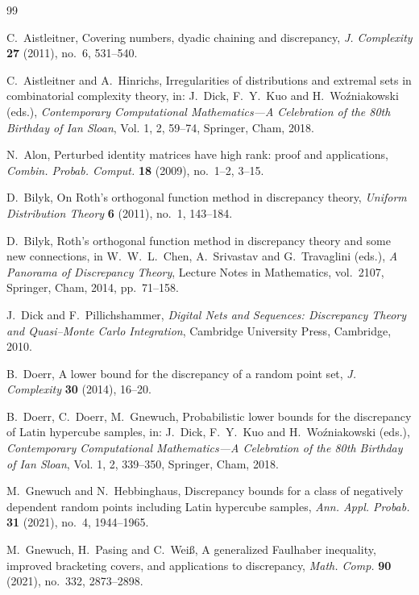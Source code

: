 \documentclass[11pt]{article}
\theoremstyle{plain}
\theoremstyle{remark}
\theoremstyle{definition}
\newcommand{\1}{\mathbf{1}}
\begin{document}
\begin{thebibliography}{99}

C.~Aistleitner,
\newblock Covering numbers, dyadic chaining and discrepancy,
\newblock \emph{J. Complexity} \textbf{27} (2011), no.~6, 531--540.

C.~Aistleitner and A.~Hinrichs,
\newblock Irregularities of distributions and extremal sets in combinatorial complexity theory,
\newblock in: J.~Dick, F.~Y.~Kuo and H.~Wo\'{z}niakowski (eds.),
\emph{Contemporary Computational Mathematics---A Celebration of the 80th Birthday of Ian Sloan}, Vol. 1, 2, 59--74, Springer, Cham, 2018.


N.~Alon,
\newblock Perturbed identity matrices have high rank:
proof and applications,
\newblock \emph{Combin. Probab. Comput.} \textbf{18} (2009),
no.~1--2, 3--15.

D.~Bilyk,
\newblock On Roth's orthogonal function method in discrepancy theory,
\newblock \emph{Uniform Distribution Theory} \textbf{6} (2011),
no.~1, 143--184.

D.~Bilyk,
\newblock Roth's orthogonal function method in discrepancy theory
and some new connections,
\newblock in W.~W.~L.~Chen, A.~Srivastav and G.~Travaglini (eds.),
\emph{A Panorama of Discrepancy Theory},
Lecture Notes in Mathematics, vol.~2107,
Springer, Cham, 2014, pp.~71--158.


J.~Dick and F.~Pillichshammer,
\newblock \emph{Digital Nets and Sequences: Discrepancy Theory and Quasi--Monte Carlo Integration},
\newblock Cambridge University Press, Cambridge, 2010.

B.~Doerr,
\newblock A lower bound for the discrepancy of a random point set,
\newblock \emph{J. Complexity} \textbf{30} (2014), 16--20.

B.~Doerr, C.~Doerr, M.~Gnewuch,
\newblock Probabilistic lower bounds for the discrepancy of Latin hypercube samples,
\newblock in: J.~Dick, F.~Y.~Kuo and H.~Wo\'{z}niakowski (eds.),
\emph{Contemporary Computational Mathematics---A Celebration of the 80th Birthday of Ian Sloan}, Vol. 1, 2, 339--350, Springer, Cham, 2018.

M.~Gnewuch and N.~Hebbinghaus,
\newblock Discrepancy bounds for a class of negatively dependent random points including Latin hypercube samples,
\newblock \emph{Ann. Appl. Probab.} \textbf{31} (2021), no.~4, 1944--1965.

M.~Gnewuch, H.~Pasing and C.~Wei\ss,
\newblock A generalized Faulhaber inequality, improved bracketing covers, and applications to discrepancy,
\newblock \emph{Math. Comp.} \textbf{90} (2021), no.~332, 2873--2898.


\end{thebibliography}
\end{document}
